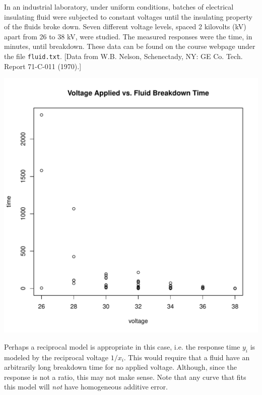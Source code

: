 \documentclass{homework}
\begin{document}
\begin{longproblem}
  In an industrial laboratory, under uniform conditions, batches of electrical insulating fluid were subjected to constant voltages until the insulating property of the fluids broke down.  Seven different voltage levels, spaced 2 kilovolts (kV) apart from 26 to 38 kV, were studied.  The measured responses were the time, in minutes, until breakdown.  These data can be found on the course webpage under the file \texttt{fluid.txt}.  [Data from W.B. Nelson, Schenectady, NY: GE Co. Tech. Report 71-C-011 (1970).]


\begin{minipage}{.45\textwidth}
\includegraphics[width=\textwidth]{voltage_time_scatter.pdf}
\end{minipage}
\begin{minipage}{.45\textwidth}
Perhaps a reciprocal model is appropriate in this case, i.e. the response time $y_i$ is modeled by the reciprocal voltage $1/x_i$. This would require that a fluid have an arbitrarily long breakdown time for no applied voltage.  Although, since the response is not a ratio, this may not make sense.  Note that any curve that fits this model will \emph{not} have homogeneous additive error.
\end{minipage}


\end{longproblem}
\end{document}
